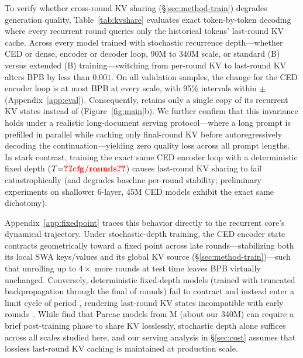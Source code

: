 To verify whether cross-round KV sharing (\S\ref{sec:method-train}) degrades generation quality, Table~\ref{tab:kvshare} evaluates exact token-by-token decoding where every recurrent round queries only the historical tokens' last-round KV cache. Across every model trained with stochastic recurrence depth—whether CED or dense, encoder or decoder loop, 90M to 340M scale, or standard (B) versus extended (B) training—switching from per-round KV to last-round KV alters BPB by less than $0.001$. On all  validation samples, the change for the CED encoder loop is at most  BPB at every scale, with 95\% intervals within $\pm$ (Appendix~\ref{app:eval}). Consequently, \ourmethod retains only a single copy of its recurrent KV states instead of  (Figure~\ref{fig:main}b). We further confirm that this invariance holds under a realistic long-document serving protocol—where a long prompt is prefilled in parallel while caching only final-round KV before autoregressively decoding the continuation—yielding zero quality loss across all prompt lengths. In stark contrast, training the exact same CED encoder loop with a deterministic fixed depth ($T{=}\val{cfg/rounds}$) causes last-round KV sharing to fail catastrophically (and degrades baseline per-round stability; preliminary experiments on shallower 6-layer, 45M CED models exhibit the exact same dichotomy).

Appendix~\ref{app:fixedpoint} traces this behavior directly to the recurrent core's dynamical trajectory. Under stochastic-depth training, the CED encoder state contracts geometrically toward a fixed point across late rounds—stabilizing both its local SWA keys/values and its global KV source (\S\ref{sec:method-train})—such that unrolling up to $4\times$ more rounds at test time leaves BPB virtually unchanged. Conversely, deterministic fixed-depth models (trained with truncated backpropagation through the final  of  rounds) fail to contract and instead enter a limit cycle of period , rendering last-round KV states incompatible with early rounds~\citep{loopsright2,benice}. While \citet{benice} find that Parcae models from M (about our 340M) can require a brief post-training phase to share KV losslessly, stochastic depth alone suffices across all scales studied here, and our serving analysis in \S\ref{sec:cost} assumes that lossless last-round KV caching is maintained at production scale.


